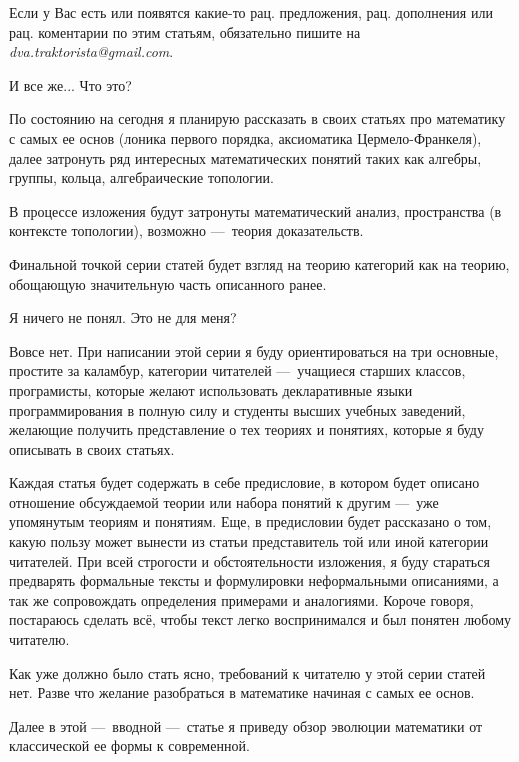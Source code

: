 \documentclass[math.tex]{subfiles}
\begin{document}
	
	Если у Вас есть или появятся какие-то рац. предложения, рац. дополнения или рац. коментарии по этим статьям, обязательно пишите на \emph{dva.traktorista@gmail.com}.

	\vspace{1cm}
	\LARGE{И все же... Что это?}\\
	\normalsize
	
	По состоянию на сегодня я планирую рассказать в своих статьях про математику с самых ее основ (лоника первого порядка, аксиоматика Цермело-Франкеля), далее затронуть ряд интересных математических понятий таких как алгебры, группы, кольца, алгебраические топологии. 
	
	В процессе изложения будут затронуты мат\-ематический анализ, пространства (в контексте топологии), возможно —\ теория доказательств.
	
	Финальной точкой серии статей будет взгляд на теорию категорий как на теорию, обощающую значительную часть описанного ранее.
	
	\vspace{1cm}
	\LARGE{Я ничего не понял. Это не для меня?}\\
	\normalsize
	
	Вовсе нет. 
При написании этой серии я буду ориентироваться на три основные, простите за каламбур, категории читателей —\ учащиеся старших классов, програ\-мисты, которые желают использовать деклар\-ативные языки программирования в полную силу и студенты высших учебных заведений, желающие получить пред\-ставление о тех теориях и понятиях, которые я буду описывать в своих статьях.
	
	Каждая статья будет содержать в себе предисловие, в котором будет описано отношение обсуждаемой теории или набора понятий к другим —\ уже упомянутым теориям и понятиям. 
Еще, в предисловии будет рассказано о том, какую пользу может вынести из статьи представитель той или
иной категории читателей.
При всей строгости и обстоятельности изложения, я буду стараться предварять фор\-мальные тексты и формулировки неформальными описаниями, а так же сопро\-вождать опре\-деления примерами и аналогиями.
Короче говоря, постараюсь сделать всё, чтобы текст легко воспринимался и был понятен любому читателю.

	Как уже должно было стать ясно, требований к читателю у этой серии статей нет. Разве что
желание разобраться в математике начиная с самых ее основ.
	
	Далее в этой —\ вводной —\ статье я приведу обзор эволюции математики от классической ее формы
к современной.
	
\end{document}
